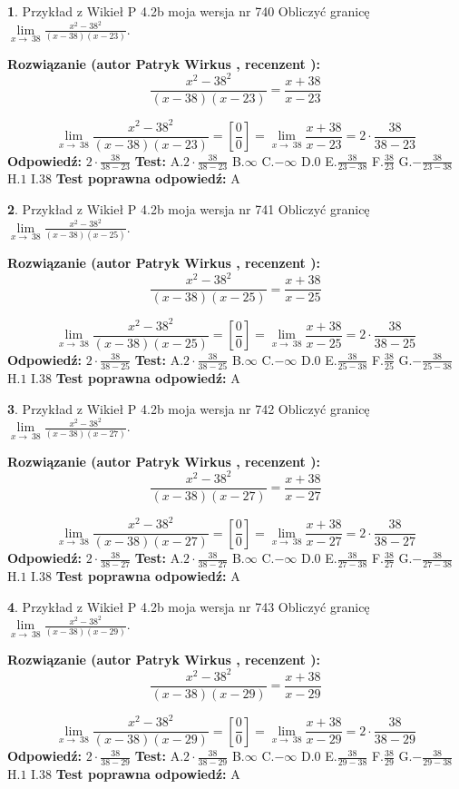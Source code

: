 \documentclass[12pt, a4paper]{article}
\theoremstyle{definition} %
\newtheorem{zad}{}
\newcommand{\zadStart}[1]{\begin{zad}#1\newline}
\newcommand{\zadStop}{\end{zad}}
\newcommand{\rozwStart}[2]{\noindent \textbf{Rozwiązanie (autor #1 , recenzent #2): }\newline}
\newcommand{\rozwStop}{\newline}
\newcommand{\odpStart}{\noindent \textbf{Odpowiedź:}\newline}
\newcommand{\odpStop}{\newline}
\newcommand{\testStart}{\noindent \textbf{Test:}\newline}
\newcommand{\testStop}{\newline}
\newcommand{\kluczStart}{\noindent \textbf{Test poprawna odpowiedź:}\newline}
\newcommand{\kluczStop}{\newline}
\begin{document}
\zadStart{Przykład z Wikieł P 4.2b moja wersja nr 740}
Obliczyć granicę $\lim\limits_{x\to\ 38}\frac{x^{2}-38^{2}}{(x-38)(x-23)}$.
\zadStop
\rozwStart{Patryk Wirkus}{}
$$\frac{x^{2}-38^{2}}{(x-38)(x-23)}=\frac{x+38}{x-23}$$

$$\lim\limits_{x\to\ 38}\frac{x^{2}-38^{2}}{(x-38)(x-23)}=[\frac{0}{0}]=\lim\limits_{x\to\ 38}\frac{x+38}{x-23}=2 \cdot \frac{38}{38-23}$$
\rozwStop
\odpStart
$2 \cdot \frac{38}{38-23}$
\odpStop
\testStart
A.$2 \cdot \frac{38}{38-23}$
B.$\infty$
C.$-\infty$
D.$0$
E.$\frac{38}{23-38}$
F.$\frac{38}{23}$
G.$-\frac{38}{23-38}$
H.$1$
I.$38$
\testStop
\kluczStart
A
\kluczStop



\zadStart{Przykład z Wikieł P 4.2b moja wersja nr 741}
Obliczyć granicę $\lim\limits_{x\to\ 38}\frac{x^{2}-38^{2}}{(x-38)(x-25)}$.
\zadStop
\rozwStart{Patryk Wirkus}{}
$$\frac{x^{2}-38^{2}}{(x-38)(x-25)}=\frac{x+38}{x-25}$$

$$\lim\limits_{x\to\ 38}\frac{x^{2}-38^{2}}{(x-38)(x-25)}=[\frac{0}{0}]=\lim\limits_{x\to\ 38}\frac{x+38}{x-25}=2 \cdot \frac{38}{38-25}$$
\rozwStop
\odpStart
$2 \cdot \frac{38}{38-25}$
\odpStop
\testStart
A.$2 \cdot \frac{38}{38-25}$
B.$\infty$
C.$-\infty$
D.$0$
E.$\frac{38}{25-38}$
F.$\frac{38}{25}$
G.$-\frac{38}{25-38}$
H.$1$
I.$38$
\testStop
\kluczStart
A
\kluczStop



\zadStart{Przykład z Wikieł P 4.2b moja wersja nr 742}
Obliczyć granicę $\lim\limits_{x\to\ 38}\frac{x^{2}-38^{2}}{(x-38)(x-27)}$.
\zadStop
\rozwStart{Patryk Wirkus}{}
$$\frac{x^{2}-38^{2}}{(x-38)(x-27)}=\frac{x+38}{x-27}$$

$$\lim\limits_{x\to\ 38}\frac{x^{2}-38^{2}}{(x-38)(x-27)}=[\frac{0}{0}]=\lim\limits_{x\to\ 38}\frac{x+38}{x-27}=2 \cdot \frac{38}{38-27}$$
\rozwStop
\odpStart
$2 \cdot \frac{38}{38-27}$
\odpStop
\testStart
A.$2 \cdot \frac{38}{38-27}$
B.$\infty$
C.$-\infty$
D.$0$
E.$\frac{38}{27-38}$
F.$\frac{38}{27}$
G.$-\frac{38}{27-38}$
H.$1$
I.$38$
\testStop
\kluczStart
A
\kluczStop



\zadStart{Przykład z Wikieł P 4.2b moja wersja nr 743}
Obliczyć granicę $\lim\limits_{x\to\ 38}\frac{x^{2}-38^{2}}{(x-38)(x-29)}$.
\zadStop
\rozwStart{Patryk Wirkus}{}
$$\frac{x^{2}-38^{2}}{(x-38)(x-29)}=\frac{x+38}{x-29}$$

$$\lim\limits_{x\to\ 38}\frac{x^{2}-38^{2}}{(x-38)(x-29)}=[\frac{0}{0}]=\lim\limits_{x\to\ 38}\frac{x+38}{x-29}=2 \cdot \frac{38}{38-29}$$
\rozwStop
\odpStart
$2 \cdot \frac{38}{38-29}$
\odpStop
\testStart
A.$2 \cdot \frac{38}{38-29}$
B.$\infty$
C.$-\infty$
D.$0$
E.$\frac{38}{29-38}$
F.$\frac{38}{29}$
G.$-\frac{38}{29-38}$
H.$1$
I.$38$
\testStop
\kluczStart
A
\kluczStop
\end{document}

